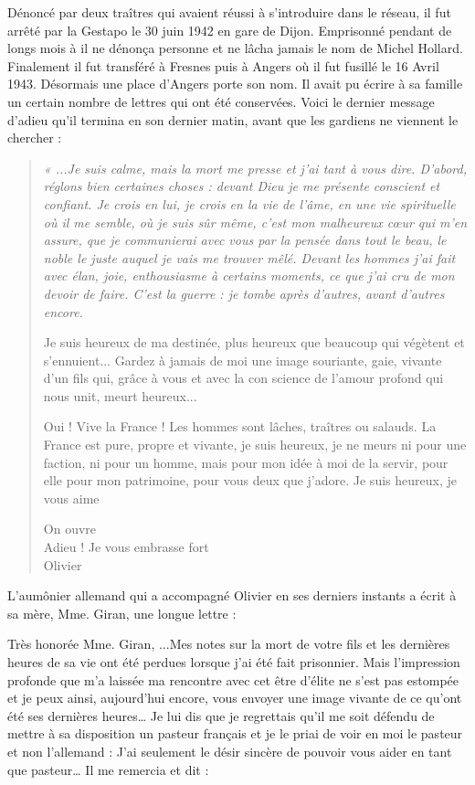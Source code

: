 Dénoncé par deux traîtres qui avaient réussi à s’introduire dans le réseau, il fut arrêté par la
Gestapo le 30 juin 1942 en gare de Dijon. Emprisonné pendant de longs mois à il ne dénonça
personne et ne lâcha jamais le nom de Michel Hollard. Finalement il fut transféré à Fresnes
puis à Angers où il fut fusillé le 16 Avril 1943. Désormais une place d’Angers porte son nom.
Il avait pu écrire à sa famille un certain nombre de lettres qui ont été conservées. Voici le
dernier message d’adieu qu’il termina en son dernier matin, avant que les gardiens ne
viennent le chercher :

\begin{quote}\itshape
« ...Je suis calme, mais la mort me presse et j’ai tant à vous dire. D’abord, réglons bien certaines choses :
devant Dieu je me présente conscient et confiant. Je crois en lui, je crois en la vie de l’âme, en une vie spirituelle
où il me semble, où je suis sûr même, c’est mon malheureux cœur qui m’en assure, que je communierai avec
vous par la pensée dans tout le beau, le noble le juste auquel je vais me trouver mêlé.
Devant les hommes j’ai fait avec élan, joie, enthousiasme à certains moments, ce que j’ai cru de mon devoir de
faire. C’est la guerre : je tombe après d’autres, avant d’autres encore.

Je suis heureux de ma destinée, plus heureux que beaucoup qui végètent et s’ennuient... Gardez à jamais de moi
une image souriante, gaie, vivante d’un fils qui, grâce à vous et avec la con science de l’amour profond qui nous
unit, meurt heureux...

Oui ! Vive la France ! Les hommes sont lâches, traîtres ou salauds. La France est pure, propre et vivante, je suis
heureux, je ne meurs ni pour une faction, ni pour un homme, mais pour mon idée à moi de la servir, pour elle
pour mon patrimoine, pour vous deux que j’adore.
Je suis heureux, je vous aime

\begin{flushright}
On ouvre\\
Adieu ! Je vous embrasse fort\\
Olivier
\end{flushright}
\end{quote}

L’aumônier allemand qui a accompagné Olivier en ses derniers instants a écrit à sa mère, Mme.
Giran, une longue lettre :

Très honorée Mme. Giran,
...Mes notes sur la mort de votre fils et les dernières heures de sa vie ont été perdues lorsque j’ai
été fait prisonnier. Mais l’impression profonde que m’a laissée ma rencontre avec cet être d’élite
ne s’est pas estompée et je peux ainsi, aujourd’hui encore, vous envoyer une image vivante de ce
qu’ont été ses dernières heures…
Je lui dis que je regrettais qu’il me soit défendu de mettre à sa disposition un pasteur français et je
le priai de voir en moi le pasteur et non l’allemand : J’ai seulement le désir sincère de pouvoir
vous aider en tant que pasteur… Il me remercia et dit :

